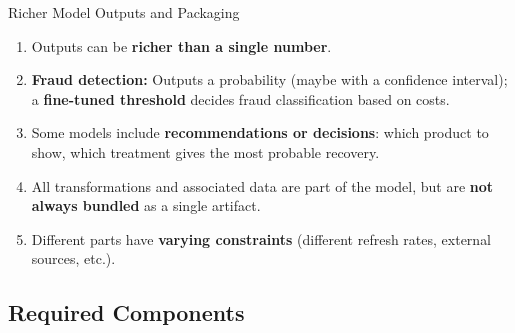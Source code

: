 \begin{frame}{Richer Model Outputs and Packaging}
\begin{enumerate}
\item<1-> Outputs can be \textbf{richer than a single number}.
\item<2-> \textbf{Fraud detection:} Outputs a probability (maybe with a confidence interval); a \textbf{fine-tuned threshold} decides fraud classification based on costs.
\item<3-> Some models include \textbf{recommendations or decisions}: which product to show, which treatment gives the most probable recovery.
\item<4-> All transformations and associated data are part of the model, but are \textbf{not always bundled} as a single artifact.
\item<5-> Different parts have \textbf{varying constraints} (different refresh rates, external sources, etc.).
\end{enumerate}
\end{frame}

\subsection{Required Components}

